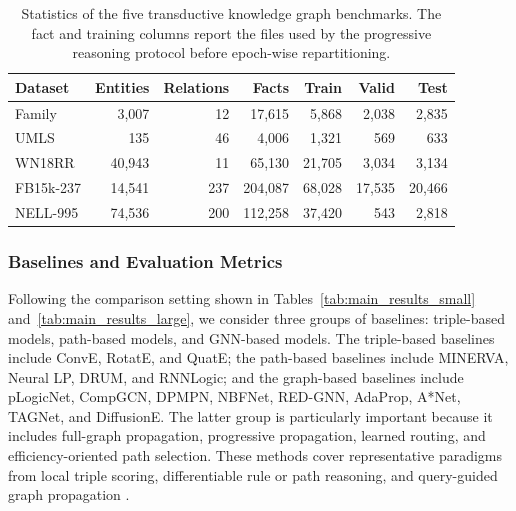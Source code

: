 \documentclass[a4paper,fleqn]{cas-sc}
\begin{document}
\begin{table}[t]
\caption{Statistics of the five transductive knowledge graph benchmarks. The
fact and training columns report the files used by the progressive reasoning
protocol before epoch-wise repartitioning.}
\label{tab:dataset_statistics}
\centering
\small
\setlength{\tabcolsep}{4.0pt}
\begin{tabular}{lrrrrrr}
\toprule
Dataset & Entities & Relations & Facts & Train & Valid & Test \\
\midrule
Family      & 3,007  & 12  & 17,615  & 5,868  & 2,038  & 2,835 \\
UMLS        & 135    & 46  & 4,006   & 1,321  & 569    & 633 \\
WN18RR      & 40,943 & 11  & 65,130  & 21,705 & 3,034  & 3,134 \\
FB15k-237   & 14,541 & 237 & 204,087 & 68,028 & 17,535 & 20,466 \\
NELL-995    & 74,536 & 200 & 112,258 & 37,420 & 543    & 2,818 \\
\bottomrule
\end{tabular}
\end{table}

\subsubsection{Baselines and Evaluation Metrics}\label{subsec:baselines_metrics}

Following the comparison setting shown in
Tables~\ref{tab:main_results_small} and~\ref{tab:main_results_large}, we
consider three groups of baselines: triple-based models, path-based models, and
GNN-based models. The triple-based baselines include ConvE, RotatE, and QuatE;
the path-based baselines include MINERVA, Neural LP, DRUM, and RNNLogic; and
the graph-based baselines include pLogicNet, CompGCN, DPMPN, NBFNet, RED-GNN,
AdaProp, A*Net, TAGNet, and DiffusionE. The latter group is particularly
important because it includes full-graph propagation, progressive propagation,
learned routing, and efficiency-oriented path selection. These methods cover
representative paradigms from local triple scoring, differentiable rule or path
reasoning, and query-guided graph propagation
\citep{dettmers2018convolutional,sun2019rotate,yang2017neurallp,
sadeghian2019drum,qu2020rnnlogic,qu2019probabilistic,zhang2019quaternion,
das2018minerva,
vashishth2019composition,xu2019dpmpn,zhu2021neural,zhang2022knowledge,
zhang2022adaprop,zhu2023astarnet,shomer2023distance,cao2024diffusione}.
\end{document}
